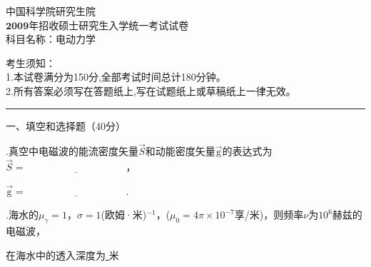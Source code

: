 \begin{center}
	\heiti
	\LARGE{中国科学院研究生院\\$\boldsymbol{2009}$年招收硕士研究生入学统一考试试卷\\
	科目名称：电动力学}

\end{center}
\noindent
考生须知：\\
1.本试卷满分为150分,全部考试时间总计180分钟。\\
2.所有答案必须写在答题纸上,写在试题纸上或草稿纸上一律无效。

\vspace*{2ex}
\hrule
\vspace*{4ex}


\setcounter{page}{1}%
\pagestyle{mypagestyle}

\onehalfspacing

\vspace{0.4cm}

\noindent
一、填空和选择题（40分）
\vspace{0.2cm}

.\hspace{0.8em}真空中电磁波的能流密度矢量$\Vec{S}$和动能密度矢量$\Vec{ \mathrm{g} }$的表达式为$\Vec{S}=\underline{  \qquad  \qquad  \qquad  \qquad \qquad }$，
\vspace{0.3cm}

\noindent
$\Vec{ \mathrm{g} }=\underline{  \qquad  \qquad  \qquad  \qquad \qquad }$.
\vspace{0.3cm}

.\hspace{0.8em}海水的$\mu_{\gamma}=1$，$\sigma=1$(欧姆·米)$^{-1}$，($\mu_0 = 4 \pi \times 10^{-7}$享/米)，则频率$\nu$为$10^6$赫兹的电磁波，
\vspace{0.2cm}

\noindent
在海水中的透入深度为\underline{  \qquad  \qquad  \qquad  \qquad \qquad }米
\vspace{0.2cm}

